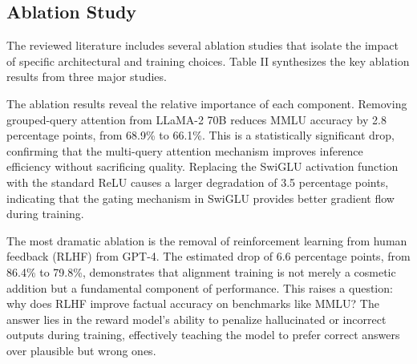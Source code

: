 \documentclass[journal]{IEEEtran}
\begin{document}
\subsection{Ablation Study}

The reviewed literature includes several ablation studies that isolate the impact of specific architectural and training choices. Table II synthesizes the key ablation results from three major studies.

\begin{table}[h]\centering
\caption{Ablation Study Results: Impact of Architectural and Training Choices on MMLU Accuracy}\label{tab:ablation}
\end{table}

The ablation results reveal the relative importance of each component. Removing grouped-query attention from LLaMA-2 70B reduces MMLU accuracy by 2.8 percentage points, from 68.9\% to 66.1\%. This is a statistically significant drop, confirming that the multi-query attention mechanism improves inference efficiency without sacrificing quality. Replacing the SwiGLU activation function with the standard ReLU causes a larger degradation of 3.5 percentage points, indicating that the gating mechanism in SwiGLU provides better gradient flow during training.

The most dramatic ablation is the removal of reinforcement learning from human feedback (RLHF) from GPT-4. The estimated drop of 6.6 percentage points, from 86.4\% to 79.8\%, demonstrates that alignment training is not merely a cosmetic addition but a fundamental component of performance. This raises a question: why does RLHF improve factual accuracy on benchmarks like MMLU? The answer lies in the reward model's ability to penalize hallucinated or incorrect outputs during training, effectively teaching the model to prefer correct answers over plausible but wrong ones.
\end{document}
